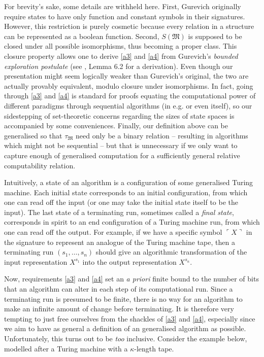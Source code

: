 \documentclass[12pt]{article}
\numberwithin{equation}{section}
\begin{document}
For brevity's sake, some details are withheld here. First, Gurevich originally require states to have only function and constant symbols in their signatures. However, this restriction is purely cosmetic because every relation in a structure can be represented as a boolean function. Second, $S(\mathfrak{M})$ is supposed to be closed under all possible isomorphisms, thus becoming a proper class. This closure property allows one to derive \ref{a3} and \ref{a4} from Gurevich's \emph{bounded exploration postulate} (see \cite{gurevich}, Lemma 6.2 for a derivation). Even though our presentation might seem logically weaker than Gurevich's original, the two are actually provably equivalent, modulo closure under isomorphisms. In fact, going through \ref{a3} and \ref{a4} is standard for proofs equating the computational power of different paradigms through sequential algorithms (in e.g. \cite{dershowitz} or even \cite{gurevich} itself), so our sidestepping of set-theoretic concerns regarding the sizes of state spaces is accompanied by some conveniences. Finally, our definition above can be generalised so that $\tau_{\mathfrak{M}}$ need only be a binary relation -- resulting in algorithms which might not be sequential -- but that is unnecessary if we only want to capture enough of generalised computation for a sufficiently general relative computability relation.

Intuitively, a state of an algorithm is a configuration of some generalised Turing machine. Each initial state corresponds to an initial configuration, from which one can read off the input (or one may take the initial state itself to be the input). The last state of a terminating run, sometimes called a \emph{final state}, corresponds in spirit to an end configuration of a Turing machine run, from which one can read off the output. For example, if we have a specific symbol $\ulcorner X \urcorner$ in the signature to represent an analogue of the Turing machine tape, then a terminating run $(s_1, \dots, s_n)$ should give an algorithmic transformation of the input representation $X^{s_1}$ into the output representation $X^{s_n}$.

Now, requirements \ref{a3} and \ref{a4} set an \textit{a priori} finite bound to the number of bits that an algorithm can alter in each step of its computational run. Since a terminating run is presumed to be finite, there is no way for an algorithm to make an infinite amount of change before terminating. It is therefore very tempting to just free ourselves from the shackles of \ref{a3} and \ref{a4}, especially since we aim to have as general a definition of an generalised algorithm as possible. Unfortunately, this turns out to be \textit{too} inclusive. Consider the example below, modelled after a Turing machine with a $\kappa$-length tape.
\end{document}
